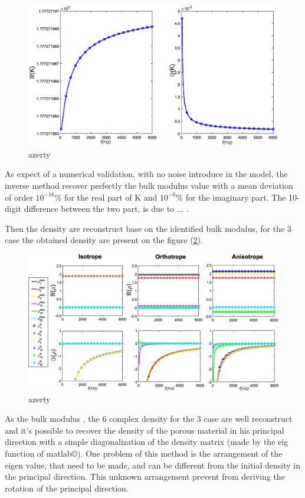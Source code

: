 \documentclass{article}
\begin{document}
    \begin{figure}[ht!]
        \centering
        \includegraphics[scale=0.3]{Bulk.eps}
        \caption{azerty}
        \label{Grph_K}
    \end{figure}
    
    As expect of a numerical validation, with no noise introduce in the model, the inverse method recover perfectly the bulk modulus value with a mean deviation of order $10^{-16}\%$ for the real part of K and $10^{-6}\%$ for the imaginary part. The 10-digit difference between the two part, is due to ... .
    
    Then the density are reconstruct base on the identified bulk modulus,  for the 3 case the obtained density are present on the figure (\ref{Grph_rho_rot}).
    \begin{figure}[ht!]
        \centering
        \includegraphics[scale=0.4]{Density_rot.eps}
        \caption{azerty}
        \label{Grph_rho_rot}
    \end{figure}
    
    As the bulk modulus , the 6 complex density for the 3 case are well reconstruct and it's possible to recover the density of the porous material in his principal direction with a simple diagonalization of the density matrix (made by the eig function of matlab\copyright). One problem of this method is the arrangement of the eigen value, that need to be made, and can be different from the initial density in the principal direction. This unknown arrangement prevent from deriving the rotation of the principal direction.
    
\end{document}
